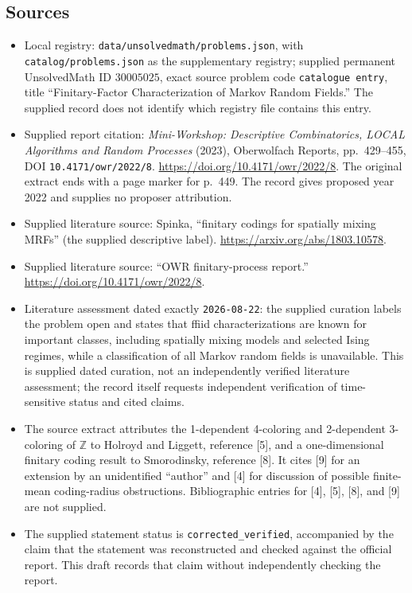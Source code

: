 \documentclass[11pt]{article}
\newcommand{\Z}{\mathbb{Z}}
\begin{document}
\subsection{Sources}
\begin{itemize}
\item Local registry: \texttt{data/unsolvedmath/problems.json}, with \texttt{catalog/problems.json} as the supplementary registry; supplied permanent UnsolvedMath ID \(30005025\), exact source problem code \texttt{catalogue entry}, title ``Finitary-Factor Characterization of Markov Random Fields.'' The supplied record does not identify which registry file contains this entry.
\item Supplied report citation: \emph{Mini-Workshop: Descriptive Combinatorics, LOCAL Algorithms and Random Processes} (2023), Oberwolfach Reports, pp.\ 429--455, DOI \texttt{10.4171/owr/2022/8}. \url{https://doi.org/10.4171/owr/2022/8}. The original extract ends with a page marker for p.\ 449. The record gives proposed year 2022 and supplies no proposer attribution.
\item Supplied literature source: Spinka, ``finitary codings for spatially mixing MRFs'' (the supplied descriptive label). \url{https://arxiv.org/abs/1803.10578}.
\item Supplied literature source: ``OWR finitary-process report.'' \url{https://doi.org/10.4171/owr/2022/8}.
\item Literature assessment dated exactly \texttt{2026-08-22}: the supplied curation labels the problem open and states that ffiid characterizations are known for important classes, including spatially mixing models and selected Ising regimes, while a classification of all Markov random fields is unavailable. This is supplied dated curation, not an independently verified literature assessment; the record itself requests independent verification of time-sensitive status and cited claims.
\item The source extract attributes the 1-dependent 4-coloring and 2-dependent 3-coloring of \(\Z\) to Holroyd and Liggett, reference [5], and a one-dimensional finitary coding result to Smorodinsky, reference [8]. It cites [9] for an extension by an unidentified ``author'' and [4] for discussion of possible finite-mean coding-radius obstructions. Bibliographic entries for [4], [5], [8], and [9] are not supplied.
\item The supplied statement status is \texttt{corrected\_verified}, accompanied by the claim that the statement was reconstructed and checked against the official report. This draft records that claim without independently checking the report.
\end{itemize}
\end{document}
